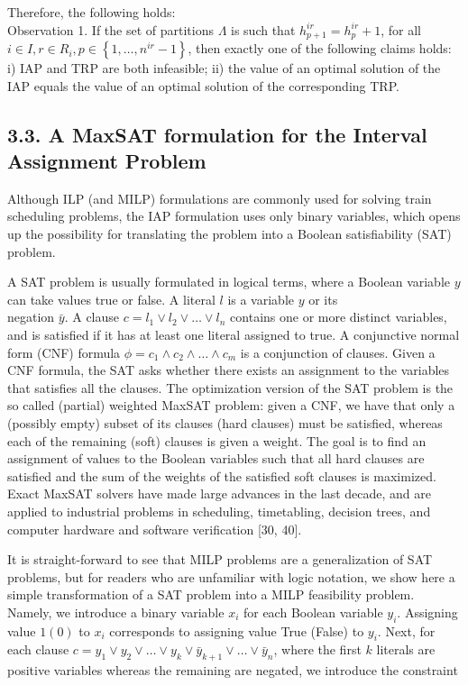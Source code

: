 \documentclass[10pt]{article}
\begin{document}
Therefore, the following holds:\\
Observation 1. If the set of partitions $\Lambda$ is such that $h_{p+1}^{i r}=h_{p}^{i r}+1$, for all $i \in I, r \in R_{i}, p \in\left\{1, \ldots, n^{i r}-1\right\}$, then exactly one of the following claims holds: i) IAP and TRP are both infeasible; ii) the value of an optimal solution of the IAP equals the value of an optimal solution of the corresponding TRP.

\subsection*{3.3. A MaxSAT formulation for the Interval Assignment Problem}
Although ILP (and MILP) formulations are commonly used for solving train scheduling problems, the IAP formulation uses only binary variables, which opens up the possibility for translating the problem into a Boolean satisfiability (SAT) problem.

A SAT problem is usually formulated in logical terms, where a Boolean variable $y$ can take values true or false. A literal $l$ is a variable $y$ or its\\
negation $\bar{y}$. A clause $c=l_{1} \vee l_{2} \vee \ldots \vee l_{n}$ contains one or more distinct variables, and is satisfied if it has at least one literal assigned to true. A conjunctive normal form (CNF) formula $\phi=c_{1} \wedge c_{2} \wedge \ldots \wedge c_{m}$ is a conjunction of clauses. Given a CNF formula, the SAT asks whether there exists an assignment to the variables that satisfies all the clauses. The optimization version of the SAT problem is the so called (partial) weighted MaxSAT problem: given a CNF, we have that only a (possibly empty) subset of its clauses (hard clauses) must be satisfied, whereas each of the remaining (soft) clauses is given a weight. The goal is to find an assignment of values to the Boolean variables such that all hard clauses are satisfied and the sum of the weights of the satisfied soft clauses is maximized. Exact MaxSAT solvers have made large advances in the last decade, and are applied to industrial problems in scheduling, timetabling, decision trees, and computer hardware and software verification [30, 40].

It is straight-forward to see that MILP problems are a generalization of SAT problems, but for readers who are unfamiliar with logic notation, we show here a simple transformation of a SAT problem into a MILP feasibility problem. Namely, we introduce a binary variable $x_{i}$ for each Boolean variable $y_{i}$. Assigning value $1(0)$ to $x_{i}$ corresponds to assigning value True (False) to $y_{i}$. Next, for each clause $c=y_{1} \vee y_{2} \vee \ldots \vee y_{k} \vee \bar{y}_{k+1} \vee \ldots \vee \bar{y}_{n}$, where the first $k$ literals are positive variables whereas the remaining are negated, we introduce the constraint
\end{document}
